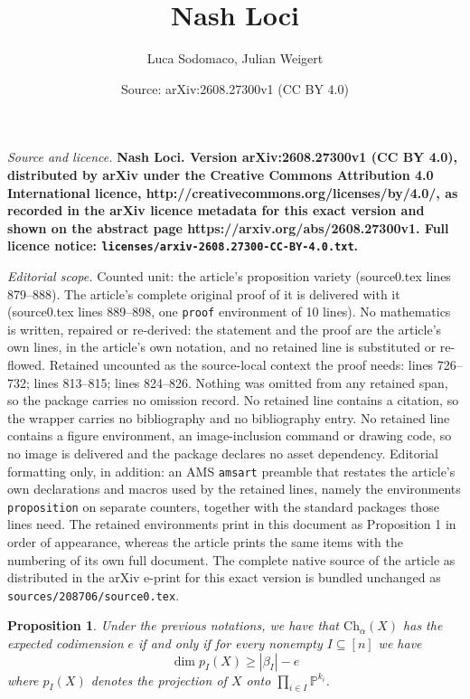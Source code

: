 \documentclass[10pt,a4paper]{amsart}
\title{\bf Nash Loci}
\author{Luca Sodomaco, Julian Weigert}
\date{Source: arXiv:2608.27300v1 (CC BY 4.0)}
\newtheorem{proposition}{Proposition}
\begin{document}
\maketitle

\noindent\emph{Source and licence.} \bf Nash Loci. Version arXiv:2608.27300v1 (CC BY 4.0), distributed by arXiv under the Creative Commons Attribution 4.0 International licence, http://creativecommons.org/licenses/by/4.0/, as recorded in the arXiv licence metadata for this exact version and shown on the abstract page https://arxiv.org/abs/2608.27300v1. Full licence notice: \texttt{licenses/arxiv-2608.27300-CC-BY-4.0.txt}.\par\smallskip

\noindent\textit{Editorial scope.} Counted unit: the article's proposition variety (source0.tex lines 879--888). The article's complete original proof of it is delivered with it (source0.tex lines 889--898, one \texttt{proof} environment of 10 lines). No mathematics is written, repaired or re-derived: the statement and the proof are the article's own lines, in the article's own notation, and no retained line is substituted or re-flowed.  Retained uncounted as the source-local context the proof needs: lines 726--732; lines 813--815; lines 824--826.  Nothing was omitted from any retained span, so the package carries no omission record.  No retained line contains a citation, so the wrapper carries no bibliography and no bibliography entry.  No retained line contains a figure environment, an image-inclusion command or drawing code, so no image is delivered and the package declares no asset dependency.  Editorial formatting only, in addition: an AMS \texttt{amsart} preamble that restates the article's own declarations and macros used by the retained lines, namely the environments \texttt{proposition} on separate counters, together with the standard packages those lines need.  The retained environments print in this document as Proposition 1 in order of appearance, whereas the article prints the same items with the numbering of its own full document.  The complete native source of the article as distributed in the arXiv e-print for this exact version is bundled unchanged as \texttt{sources/208706/source0.tex}.
\begin{proposition}\label{prop: when Chow is of expected codimension}
Under the previous notations, we have that $\mathrm{Ch}_\alpha(X)$ has the expected codimension $e$ if and only if for every nonempty $I \subseteq [n]$ we have
\begin{equation}\label{eq:genericity_conditions}
    \dim p_I(X) \ge |\beta_I|-e
\end{equation}
where $p_I(X)$ denotes the projection of $X$ onto $\prod_{i\in I}\mathbb{P}^{k_i}$.
\end{proposition}
\end{document}
